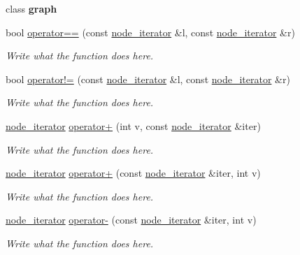 \begin{DoxyCompactItemize}
\item 
\hypertarget{classnode__iterator_ab8b0dbc1b36724e5e4635ac651c218cb}{class {\bfseries graph}}\label{classnode__iterator_ab8b0dbc1b36724e5e4635ac651c218cb}

\item 
bool \hyperlink{classnode__iterator_a8a4971ebadf282168d84a07d4914c93c}{operator==} (const \hyperlink{classnode__iterator}{node\+\_\+iterator} \&l, const \hyperlink{classnode__iterator}{node\+\_\+iterator} \&r)
\begin{DoxyCompactList}\small\item\em Write what the function does here. \end{DoxyCompactList}\item 
bool \hyperlink{classnode__iterator_ad75d23092c9ff953c3738f3454ccd9fb}{operator!=} (const \hyperlink{classnode__iterator}{node\+\_\+iterator} \&l, const \hyperlink{classnode__iterator}{node\+\_\+iterator} \&r)
\begin{DoxyCompactList}\small\item\em Write what the function does here. \end{DoxyCompactList}\item 
\hyperlink{classnode__iterator}{node\+\_\+iterator} \hyperlink{classnode__iterator_a6b1761a28d4367ba919c85f9f2c8d0e4}{operator+} (int v, const \hyperlink{classnode__iterator}{node\+\_\+iterator} \&iter)
\begin{DoxyCompactList}\small\item\em Write what the function does here. \end{DoxyCompactList}\item 
\hyperlink{classnode__iterator}{node\+\_\+iterator} \hyperlink{classnode__iterator_a08e8068052fc1729d5b6a350e9dd1346}{operator+} (const \hyperlink{classnode__iterator}{node\+\_\+iterator} \&iter, int v)
\begin{DoxyCompactList}\small\item\em Write what the function does here. \end{DoxyCompactList}\item 
\hyperlink{classnode__iterator}{node\+\_\+iterator} \hyperlink{classnode__iterator_a0ac6efe2377fcbb51fe24924ce89608d}{operator-\/} (const \hyperlink{classnode__iterator}{node\+\_\+iterator} \&iter, int v)
\begin{DoxyCompactList}\small\item\em Write what the function does here. \end{DoxyCompactList}\item 

\end{DoxyCompactItemize}
